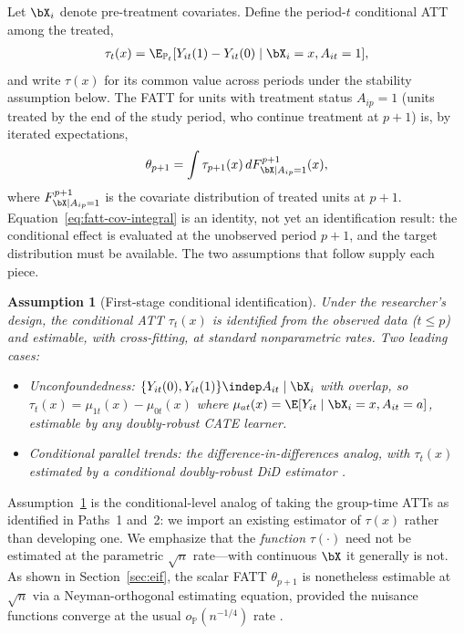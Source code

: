 \documentclass{article}
\newtheorem{assumption}{Assumption}
\renewcommand{\P}{\mathbb{P}}
\begin{document}
Let $\bX_i$ denote pre-treatment covariates. Define the period-$t$ conditional ATT among the treated,
\begin{align*}
    \tau_t(x) = \E_{\P_t}[Y_{it}(1) - Y_{it}(0) \mid \bX_i = x, A_{it} = 1],
\end{align*}
and write $\tau(x)$ for its common value across periods under the stability assumption below. The FATT for units with treatment status $A_{ip}=1$ (units treated by the end of the study period, who continue treatment at $p+1$) is, by iterated expectations,
\begin{align}
    \theta_{p+1} = \int \tau_{p+1}(x) \, dF_{\bX | A_{ip}=1}^{p+1}(x), \label{eq:fatt-cov-integral}
\end{align}
where $F_{\bX | A_{ip}=1}^{p+1}$ is the covariate distribution of treated units at $p+1$. Equation~\eqref{eq:fatt-cov-integral} is an identity, not yet an identification result: the conditional effect is evaluated at the unobserved period $p+1$, and the target distribution must be available. The two assumptions that follow supply each piece.

\begin{assumption}[First-stage conditional identification]\label{assump:cond-ident}
Under the researcher's design, the conditional ATT $\tau_t(x)$ is identified from the observed data ($t \leq p$) and estimable, with cross-fitting, at standard nonparametric rates. Two leading cases:
\begin{itemize}
    \item \emph{Unconfoundedness:} $\{Y_{it}(0), Y_{it}(1)\} \indep A_{it} \mid \bX_i$ with overlap, so $\tau_t(x) = \mu_{1t}(x) - \mu_{0t}(x)$ where $\mu_{at}(x) = \E[Y_{it} \mid \bX_i = x, A_{it} = a]$, estimable by any doubly-robust CATE learner.
    \item \emph{Conditional parallel trends:} the difference-in-differences analog, with $\tau_t(x)$ estimated by a conditional doubly-robust DiD estimator \citep{santannaDoublyRobustDifferenceindifferences2020}.
\end{itemize}
\end{assumption}

Assumption~\ref{assump:cond-ident} is the conditional-level analog of taking the group-time ATTs as identified in Paths~1 and~2: we import an existing estimator of $\tau(x)$ rather than developing one. We emphasize that the \emph{function} $\tau(\cdot)$ need not be estimated at the parametric $\sqrt{n}$ rate---with continuous $\bX$ it generally is not. As shown in Section~\ref{sec:eif}, the scalar FATT $\theta_{p+1}$ is nonetheless estimable at $\sqrt{n}$ via a Neyman-orthogonal estimating equation, provided the nuisance functions converge at the usual $o_\P(n^{-1/4})$ rate \citep{chernozhukovDoubleDebiasedMachine2018}.
\end{document}
